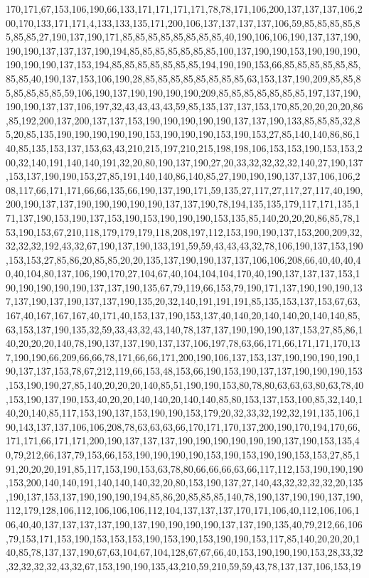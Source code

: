 170,171,67,153,106,190,66,133,171,171,171,171,78,78,171,106,200,137,137,137,106,200,170,133,171,171,4,133,133,135,171,200,106,137,137,137,137,106,59,85,85,85,85,85,85,85,27,190,137,190,171,85,85,85,85,85,85,85,85,40,190,106,106,190,137,137,190,190,190,137,137,137,190,194,85,85,85,85,85,85,85,100,137,190,190,153,190,190,190,190,190,190,137,153,194,85,85,85,85,85,85,85,194,190,190,153,66,85,85,85,85,85,85,85,85,40,190,137,153,106,190,28,85,85,85,85,85,85,85,85,63,153,137,190,209,85,85,85,85,85,85,85,59,106,190,137,190,190,190,190,209,85,85,85,85,85,85,85,197,137,190,190,190,137,137,106,197,32,43,43,43,43,59,85,135,137,137,153,170,85,20,20,20,20,86,85,192,200,137,200,137,137,153,190,190,190,190,190,137,137,190,133,85,85,85,32,85,20,85,135,190,190,190,190,190,153,190,190,190,153,190,153,27,85,140,140,86,86,140,85,135,153,137,153,63,43,210,215,197,210,215,198,198,106,153,153,190,153,153,200,32,140,191,140,140,191,32,20,80,190,137,190,27,20,33,32,32,32,32,140,27,190,137,153,137,190,190,153,27,85,191,140,140,86,140,85,27,190,190,190,137,137,106,106,208,117,66,171,171,66,66,135,66,190,137,190,171,59,135,27,117,27,117,27,117,40,190,200,190,137,137,190,190,190,190,190,137,137,190,78,194,135,135,179,117,171,135,171,137,190,153,190,137,153,190,153,190,190,190,153,135,85,140,20,20,20,86,85,78,153,190,153,67,210,118,179,179,179,118,208,197,112,153,190,190,137,153,200,209,32,32,32,32,192,43,32,67,190,137,190,133,191,59,59,43,43,43,32,78,106,190,137,153,190,153,153,27,85,86,20,85,85,20,20,135,137,190,190,137,137,106,106,208,66,40,40,40,40,40,104,80,137,106,190,170,27,104,67,40,104,104,104,170,40,190,137,137,137,153,190,190,190,190,190,137,137,190,135,67,79,119,66,153,79,190,171,137,190,190,190,137,137,190,137,190,137,137,190,135,20,32,140,191,191,191,85,135,153,137,153,67,63,167,40,167,167,167,40,171,40,153,137,190,153,137,40,140,20,140,140,20,140,140,85,63,153,137,190,135,32,59,33,43,32,43,140,78,137,137,190,190,190,137,153,27,85,86,140,20,20,20,140,78,190,137,137,190,137,137,106,197,78,63,66,171,66,171,171,170,137,190,190,66,209,66,66,78,171,66,66,171,200,190,106,137,153,137,190,190,190,190,190,137,137,153,78,67,212,119,66,153,48,153,66,190,153,190,137,137,190,190,190,153,153,190,190,27,85,140,20,20,20,140,85,51,190,190,153,80,78,80,63,63,63,80,63,78,40,153,190,137,190,153,40,20,20,140,140,20,140,140,85,80,153,137,153,100,85,32,140,140,20,140,85,117,153,190,137,153,190,190,153,179,20,32,33,32,192,32,191,135,106,190,143,137,137,106,106,208,78,63,63,63,66,170,171,170,137,200,190,170,194,170,66,171,171,66,171,171,200,190,137,137,137,190,190,190,190,190,190,137,190,153,135,40,79,212,66,137,79,153,66,153,190,190,190,190,153,190,153,190,190,153,153,27,85,191,20,20,20,191,85,117,153,190,153,63,78,80,66,66,66,63,66,117,112,153,190,190,190,153,200,140,140,191,140,140,140,32,20,80,153,190,137,27,140,43,32,32,32,32,20,135,190,137,153,137,190,190,190,194,85,86,20,85,85,85,140,78,190,137,190,190,137,190,112,179,128,106,112,106,106,106,112,104,137,137,137,170,171,106,40,112,106,106,106,40,40,137,137,137,137,190,137,190,190,190,190,137,137,190,135,40,79,212,66,106,79,153,171,153,190,153,153,153,190,153,190,153,190,190,153,117,85,140,20,20,20,140,85,78,137,137,190,67,63,104,67,104,128,67,67,66,40,153,190,190,190,153,28,33,32,32,32,32,32,43,32,67,153,190,190,135,43,210,59,210,59,59,43,78,137,137,106,153,19